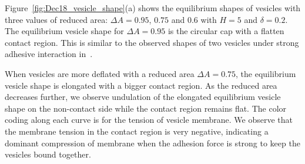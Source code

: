 \documentclass[prf,superscriptaddress,showpacs]{revtex4-1}
\begin{document}
Figure~\ref{fig:Dec18_vesicle_shape}(a) shows the equilibrium shapes of
vesicles with three values of reduced area: $\Delta A=0.95$, $0.75$ and
$0.6$ with $H=5$ and $\delta = 0.2$.  The equilibrium vesicle shape for
$\Delta A=0.95$ is the circular cap with a flatten contact region.  This
is similar to the observed shapes of two vesicles under strong adhesive
interaction
in~\cite{RamachandranAndersonLealIsraelachvili2010_Langmuir}.

When vesicles are more deflated with a reduced area  $\Delta A = 0.75$, the equilibrium vesicle shape is elongated with a bigger contact region.
As the reduced area decreases further, we observe undulation of the elongated equilibrium vesicle shape on the non-contact side while the contact region remains flat. 
The color coding along each curve is for the tension of vesicle membrane.
We observe that the membrane tension in the contact region is very negative, indicating a dominant compression of membrane when the adhesion force is strong to keep the vesicles bound together.
\end{document}
